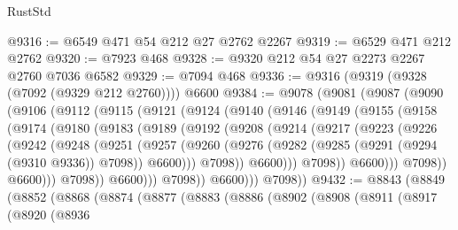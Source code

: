 \begin{lexlean}{RustStd}
\begin{coremodule}
@9316 := @6549 @471 @54 @212 @27 @2762 @2267
@9319 := @6529 @471 @212 @2762
@9320 := @7923 @468
@9328 := @9320 @212 @54 @27 @2273 @2267 @2760 @7036 @6582
@9329 := @7094 @468
@9336 := @9316 (@9319 (@9328 (@7092 (@9329 @212 @2760)))) @6600
@9384 := @9078
    (@9081
      (@9087
        (@9090
          (@9106
            (@9112
              (@9115
                (@9121
                  (@9124
                    (@9140
                      (@9146
                        (@9149
                          (@9155
                            (@9158
                              (@9174
                                (@9180
                                  (@9183
                                    (@9189
                                      (@9192
                                        (@9208
                                          (@9214
                                            (@9217
                                              (@9223
                                                (@9226
                                                  (@9242
                                                    (@9248
                                                      (@9251
                                                        (@9257
                                                          (@9260
                                                            (@9276
                                                              (@9282
                                                                (@9285
                                                                  (@9291
                                                                    (@9294 (@9310 @9336))
                                                                    @7098))
                                                                @6600)))
                                                          @7098))
                                                      @6600)))
                                                @7098))
                                            @6600)))
                                      @7098))
                                  @6600)))
                            @7098))
                        @6600)))
                  @7098))
              @6600)))
        @7098))
@9432 := @8843
    (@8849
      (@8852
        (@8868
          (@8874
            (@8877
              (@8883
                (@8886
                  (@8902
                    (@8908
                      (@8911
                        (@8917
                          (@8920
                            (@8936

\end{coremodule}
\end{lexlean}
